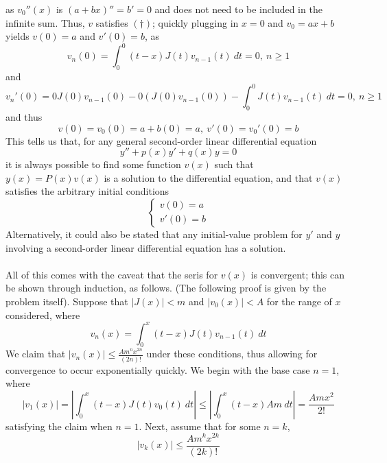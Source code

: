 \documentclass{article}
\begin{document}
as $v_0''(x)$ is $(a+bx)''=b'=0$ and does not need to be included in the infinite sum. Thus, $v$ satisfies $(\dagger)$; quickly plugging in $x=0$ and $v_0=ax+b$ yields $v(0)=a$ and $v'(0)=b$, as 
\begin{equation*}
    v_n(0)=\int_{0}^{0} (t-x)J(t)v_{n-1}(t)\ dt=0,\ n\geq 1
\end{equation*}
and
\begin{equation*}
    v_n'(0)=0J(0)v_{n-1}(0) - 0(J(0)v_{n-1}(0)) - \int_{0}^{0}J(t)v_{n-1}(t)\ dt=0,\ n\geq1
\end{equation*}
and thus 
\begin{equation*}
    v(0)=v_0(0)=a+b(0)=a,\ v'(0)=v_0'(0)=b
\end{equation*}
This tells us that, for any general second-order linear differential equation 
\begin{equation*}
    y''+p(x)y'+q(x)y=0
\end{equation*}
it is always possible to find some function $v(x)$ such that $y(x)=P(x)v(x)$ is a solution to the differential equation, and that $v(x)$ satisfies the arbitrary initial conditions 
\begin{equation*}
    \begin{cases}
        v(0)=a\\
        v'(0)=b
    \end{cases}
\end{equation*}
Alternatively, it could also be stated that any initial-value problem for $y'$ and $y$ involving a second-order linear differential equation has a solution.\\ \\
All of this comes with the caveat that the seris for $v(x)$ is convergent; this can be shown through induction, as follows. (The following proof is given by the problem itself). Suppose that $|J(x)|<m$ and $|v_0(x)|<A$ for the range of $x$ considered, where
\begin{equation*}
    v_n(x)=\int_{0}^{x} (t-x)J(t)v_{n-1}(t)\ dt
\end{equation*}
We claim that $|v_n(x)|\leq \frac{Am^n x^{2n}}{(2n)!}$ under these conditions, thus allowing for convergence to occur exponentially quickly. We begin with the base case $n=1$, where 
\begin{equation*}
    |v_1(x)|=|\int_{0}^{x} (t-x)J(t)v_0(t)\ dt| \leq |\int_{0}^{x} (t-x)Am\ dt| =\frac{Amx^2}{2!} 
\end{equation*}
satisfying the claim when $n=1$. Next, assume that for some $n=k$,
\begin{equation*}
    |v_k(x)|\leq \frac{Am^k x^{2k}}{(2k)!}
\end{equation*}
\end{document}
